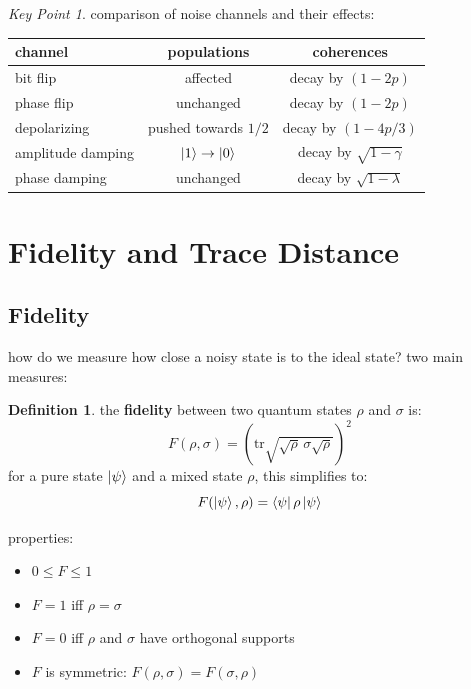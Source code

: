 \documentclass[11pt,a4paper]{article}
\theoremstyle{definition}
\newtheorem{definition}{Definition}[section]
\theoremstyle{remark}
\newtheorem*{keypoint}{Key Point}
\begin{document}
\begin{keypoint}
comparison of noise channels and their effects:
\begin{center}
\begin{tabular}{l|c|c}
channel & populations & coherences \\
\hline
bit flip & affected & decay by $(1-2p)$ \\
phase flip & unchanged & decay by $(1-2p)$ \\
depolarizing & pushed towards $1/2$ & decay by $(1-4p/3)$ \\
amplitude damping & $\ket{1} \to \ket{0}$ & decay by $\sqrt{1-\gamma}$ \\
phase damping & unchanged & decay by $\sqrt{1-\lambda}$
\end{tabular}
\end{center}
\end{keypoint}

\section{Fidelity and Trace Distance}

\subsection{Fidelity}

how do we measure how close a noisy state is to the ideal state? two main measures:

\begin{definition}
the \textbf{fidelity} between two quantum states $\rho$ and $\sigma$ is:
\[
\boxed{F(\rho, \sigma) = \left(\text{tr}\sqrt{\sqrt{\rho}\,\sigma\sqrt{\rho}}\right)^2}
\]
for a pure state $\ket{\psi}$ and a mixed state $\rho$, this simplifies to:
\[
F(\ket{\psi}, \rho) = \bra{\psi}\rho\ket{\psi}
\]
\end{definition}

properties:
\begin{itemize}
    \item $0 \leq F \leq 1$
    \item $F = 1$ iff $\rho = \sigma$
    \item $F = 0$ iff $\rho$ and $\sigma$ have orthogonal supports
    \item $F$ is symmetric: $F(\rho, \sigma) = F(\sigma, \rho)$
\end{itemize}
\end{document}
